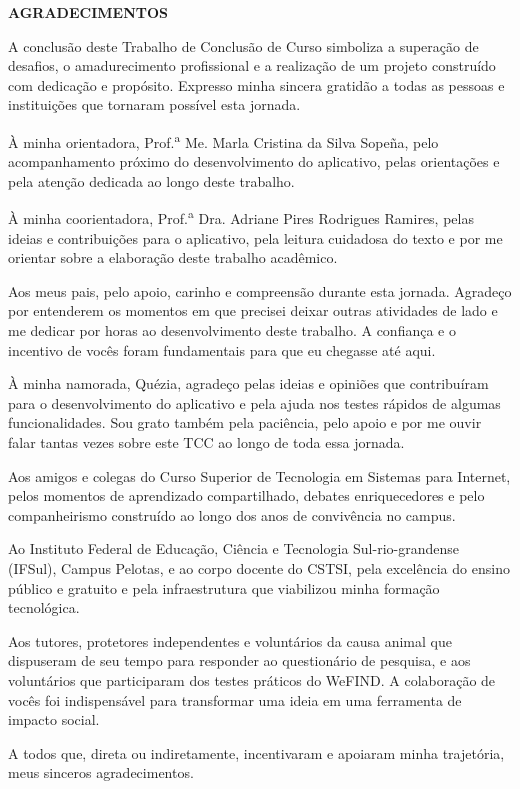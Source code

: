 \thispagestyle{empty}

\begin{center}
    \textbf{\large AGRADECIMENTOS}
\end{center}

\vspace{1.5cm}

A conclusão deste Trabalho de Conclusão de Curso simboliza a superação de desafios, o amadurecimento profissional e a realização de um projeto construído com dedicação e propósito. Expresso minha sincera gratidão a todas as pessoas e instituições que tornaram possível esta jornada.

À minha orientadora, Prof.\textsuperscript{a} Me. Marla Cristina da Silva Sopeña, pelo acompanhamento próximo do desenvolvimento do aplicativo, pelas orientações e pela atenção dedicada ao longo deste trabalho.

À minha coorientadora, Prof.\textsuperscript{a} Dra. Adriane Pires Rodrigues Ramires, pelas ideias e contribuições para o aplicativo, pela leitura cuidadosa do texto e por me orientar sobre a elaboração deste trabalho acadêmico.

Aos meus pais, pelo apoio, carinho e compreensão durante esta jornada. Agradeço por entenderem os momentos em que precisei deixar outras atividades de lado e me dedicar por horas ao desenvolvimento deste trabalho. A confiança e o incentivo de vocês foram fundamentais para que eu chegasse até aqui.

À minha namorada, Quézia, agradeço pelas ideias e opiniões que contribuíram para o desenvolvimento do aplicativo e pela ajuda nos testes rápidos de algumas funcionalidades. Sou grato também pela paciência, pelo apoio e por me ouvir falar tantas vezes sobre este TCC ao longo de toda essa jornada.

Aos amigos e colegas do Curso Superior de Tecnologia em Sistemas para Internet, pelos momentos de aprendizado compartilhado, debates enriquecedores e pelo companheirismo construído ao longo dos anos de convivência no campus.

Ao Instituto Federal de Educação, Ciência e Tecnologia Sul-rio-grandense (IFSul), Campus Pelotas, e ao corpo docente do CSTSI, pela excelência do ensino público e gratuito e pela infraestrutura que viabilizou minha formação tecnológica.

Aos tutores, protetores independentes e voluntários da causa animal que dispuseram de seu tempo para responder ao questionário de pesquisa, e aos voluntários que participaram dos testes práticos do WeFIND. A colaboração de vocês foi indispensável para transformar uma ideia em uma ferramenta de impacto social.

A todos que, direta ou indiretamente, incentivaram e apoiaram minha trajetória, meus sinceros agradecimentos.

\clearpage
